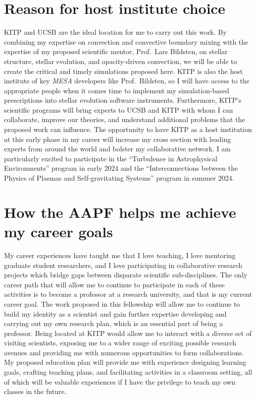 \documentclass[11pt]{amsart} %
\theoremstyle{definition}
\numberwithin{equation}{section}
\begin{document}
\section{Reason for host institute choice}

KITP and UCSB are the ideal location for me to carry out this work.
By combining my expertise on convection and convective boundary mixing with the expertise of my proposed scientific mentor, Prof.~Lars Bildsten, on stellar structure, stellar evolution, and opacity-driven convection, we will be able to create the critical and timely simulations proposed here.
KITP is also the host institute of key \emph{MESA} developers like Prof.~Bildsten, so I will have access to the appropriate people when it comes time to implement my simulation-based prescriptions into stellar evolution software instruments.
Furthermore, KITP's scientific programs will bring experts to UCSB and KITP with whom I can collaborate, improve our theories, and understand additional problems that the proposed work can influence.
The opportunity to have KITP as a host institution at this early phase in my career will increase my cross section with leading experts from around the world and bolster my collaborative network.
I am particularly excited to participate in the ``Turbulence in Astrophysical Environments'' program in early 2024 and the ``Interconnections between the Physics of Plasmas and Self-gravitating Systems'' program in summer 2024.


\section{How the AAPF helps me achieve my career goals}

My career experiences have taught me that I love teaching, I love mentoring graduate student researchers, and I love participating in collaborative research projects which bridge gaps between disparate scientific sub-disciplines.
The only career path that will allow me to continue to participate in each of these activities is to become a professor at a research university, and that is my current career goal.
The work proposed in this fellowship will allow me to continue to build my identity as a scientist and gain further expertise developing and carrying out my own research plan, which is an essential part of being a professor.
Being located at KITP would allow me to interact with a diverse set of visiting scientists, exposing me to a wider range of exciting possible research avenues and providing me with numerous opportunities to form collaborations.
My proposed education plan will provide me with experience designing learning goals, crafting teaching plans, and facilitating activities in a classroom setting, all of which will be valuable experiences if I have the privilege to teach my own classes in the future.
\end{document}
